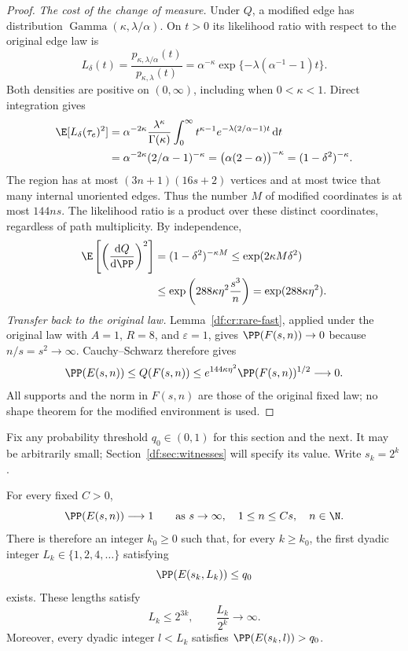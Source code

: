 \begin{proof}
\emph{The cost of the change of measure.}
Under $Q$, a modified edge has distribution
$\operatorname{Gamma}(\kappa,\lambda/\alpha)$. On $t>0$ its likelihood
ratio with respect to the original edge law is
\[
 L_\delta(t)
 =\frac{p_{\kappa,\lambda/\alpha}(t)}{p_{\kappa,\lambda}(t)}
 =\alpha^{-\kappa}
    \exp\{-\lambda(\alpha^{-1}-1)t\}.
\]
Both densities are positive on $(0,\infty)$, including when
$0<\kappa<1$. Direct integration gives
\[
 \begin{split}
 \E[L_\delta(\tau_e)^2]
 &=\alpha^{-2\kappa}\frac{\lambda^\kappa}{\Gamma(\kappa)}
   \int_0^\infty t^{\kappa-1}
     e^{-\lambda(2/\alpha-1)t}\,\mathrm d t\\
 &=\alpha^{-2\kappa}(2/\alpha-1)^{-\kappa}
   =\bigl(\alpha(2-\alpha)\bigr)^{-\kappa}
   =(1-\delta^2)^{-\kappa}.
 \end{split}
\]
The region has at most $(3n+1)(16s+2)$ vertices and at most twice that
many internal unoriented edges. Thus the number $M$ of modified
coordinates is at most $144ns$. The likelihood ratio is a product
over these distinct coordinates, regardless of path multiplicity.
By independence,
\[
 \begin{split}
 \E\left[\left(\frac{\mathrm d Q}{\mathrm d\PP}\right)^2\right]
 &=(1-\delta^2)^{-\kappa M}
 \le \exp(2\kappa M\delta^2)\\
 &\le \exp\left(288\kappa\eta^2\frac{s^3}{n}\right)
 =\exp(288\kappa\eta^2).
 \end{split}
\]
\emph{Transfer back to the original law.}
Lemma~\ref{df:cr:rare-fast}, applied under the original law with $A=1$,
$R=8$, and $\varepsilon=1$, gives $\PP(F(s,n))\to0$ because $n/s=s^2\to\infty$.
Cauchy--Schwarz therefore gives
\[
 \PP(E(s,n))\le Q(F(s,n))
 \le e^{144\kappa\eta^2}\PP(F(s,n))^{1/2}\longrightarrow0.
\]
All supports and the norm in $F(s,n)$ are those of the original fixed
law; no shape theorem for the modified environment is used.
\end{proof}

Fix any probability threshold $q_0\in(0,1)$ for this section and the
next. It may be arbitrarily small; Section~\ref{df:sec:witnesses}
will specify its value. Write $s_k=2^k$.

\begin{lemma}\label{df:gr:characteristic-lengths}
For every fixed $C>0$,
\begin{equation}\label{df:eq:gr-short-crossings}
 \PP(E(s,n))\longrightarrow1
 \qquad\text{as }s\to\infty,\quad 1\leq n\leq Cs,\quad n\in\N.
\end{equation}
There is therefore an integer $k_0\geq0$ such that, for every $k\geq k_0$,
the first dyadic integer $L_k\in\{1,2,4,\ldots\}$ satisfying
\begin{equation}\label{df:eq:gr-characteristic-threshold}
 \PP(E(s_k,L_k))\leq q_0
\end{equation}
exists. These lengths satisfy
\begin{equation}\label{df:eq:gr-characteristic-bounds}
 L_k\leq2^{3k},\qquad \frac{L_k}{2^k}\longrightarrow\infty.
\end{equation}
Moreover, every dyadic integer $l<L_k$ satisfies
$\PP(E(s_k,l))>q_0$.
\end{lemma}

